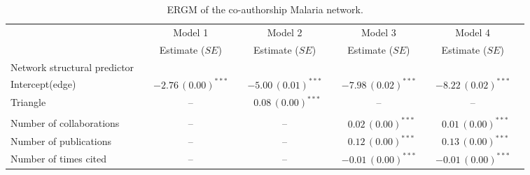 \begin{table}[!h]
\caption{ERGM of the co-authorship Malaria network.} \scriptsize
\label{tab:malaria_ergm}
\hspace*{-1.5cm}
      \begin{tabular}{@{}lcclclclcl@{}}
        \toprule
           &  & Model 1 &  & Model 2  &  & Model 3&  & Model 4\\ \cmidrule{3-3} \cmidrule{5-5} \cmidrule{7-7} \cmidrule{9-9}
           &  & Estimate ($SE$) &  & Estimate ($SE$)  &  & Estimate ($SE$) &  & Estimate ($SE$)\\ \midrule
        Network structural predictor &  &   &  &  &  & &  & \\
        \hspace{10pt}Intercept(edge) &  & $-2.76\hspace{2pt}(0.00)^{***}$  &  & $-5.00\hspace{2pt}(0.01)^{***}$   &  & $-7.98\hspace{2pt}(0.02)^{***}$ &  & $-8.22\hspace{2pt}(0.02)^{***}$\\
        \hspace{10pt}Triangle &  & --   &  & $\hspace{6pt}0.08\hspace{2pt}(0.00)^{***}$   &  & --  &  & --\\ \\
        Number of collaborations &  & --   &  & --  &  & $\hspace{6pt}0.02\hspace{2pt}(0.00)^{***}$  &  & $\hspace{6pt}0.01\hspace{2pt}(0.00)^{***}$\\%
        Number of publications &  & --   &  & --  &  & $\hspace{6pt}0.12\hspace{2pt}(0.00)^{***}$  &  & $\hspace{6pt}0.13\hspace{2pt}(0.00)^{***}$\\%
        Number of times cited &  & --   &  & --   &  & $-0.01\hspace{2pt}(0.00)^{***}$  &  & $-0.01\hspace{2pt}(0.00)^{***}$\\%

\end{tabular}
\end{table}

